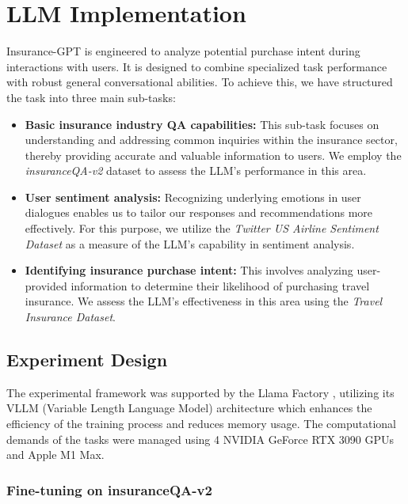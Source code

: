 \documentclass[conference]{IEEEtran}
\begin{document}
\section{LLM Implementation}

Insurance-GPT is engineered to analyze potential purchase intent during interactions with users. It is designed to combine specialized task performance with robust general conversational abilities. To achieve this, we have structured the task into three main sub-tasks:
\begin{itemize}
\item \textbf{Basic insurance industry QA capabilities:} This sub-task focuses on understanding and addressing common inquiries within the insurance sector, thereby providing accurate and valuable information to users. We employ the \textit{insuranceQA-v2} dataset to assess the LLM's performance in this area.

\item\textbf{User sentiment analysis:} Recognizing underlying emotions in user dialogues enables us to tailor our responses and recommendations more effectively. For this purpose, we utilize the \textit{Twitter US Airline Sentiment Dataset} as a measure of the LLM’s capability in sentiment analysis.

\item \textbf{Identifying insurance purchase intent:} This involves analyzing user-provided information to determine their likelihood of purchasing travel insurance. We assess the LLM's effectiveness in this area using the 
\textit{Travel Insurance Dataset}.
\end{itemize}

\subsection{Experiment Design}

The experimental framework was supported by the Llama Factory \cite{zheng2024llamafactory}, utilizing its VLLM (Variable Length Language Model) architecture \cite{kwon2023efficient} which enhances the efficiency of the training process and reduces memory usage. The computational demands of the tasks were managed using 4 NVIDIA GeForce RTX 3090 GPUs and Apple M1 Max.

\subsubsection{Fine-tuning on insuranceQA-v2}
\end{document}
